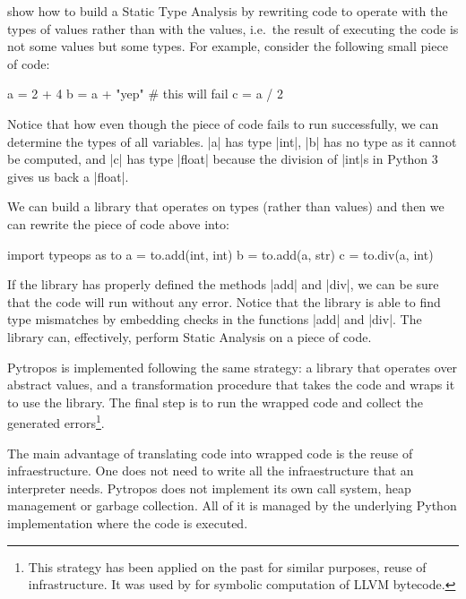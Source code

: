 \textcite{ortin_towards_2015} show how to build a Static Type Analysis
by rewriting code to operate with the types of values rather than with
the values, i.e.~the result of executing the code is not some values but
some types. For example, consider the following small piece of code:

\begin{pythoncode}
a = 2 + 4
b = a + "yep"  # this will fail
c = a / 2
\end{pythoncode}

Notice that how even though the piece of code fails to run successfully,
we can determine the types of all variables. \pycode|a| has type
\pycode|int|, \pycode|b| has no type as it cannot be
computed, and \pycode|c| has type \pycode|float| because the
division of \pycode|int|s in Python 3 gives us back a \pycode|float|.

We can build a library that operates on types (rather than values) and
then we can rewrite the piece of code above into:

\begin{pythoncode}
import typeops as to
a = to.add(int, int)
b = to.add(a, str)
c = to.div(a, int)
\end{pythoncode}

If the library has properly defined the methods \pycode|add| and
\pycode|div|, we can be sure that the code will run without any error.
Notice that the library is able to find type mismatches by embedding
checks in the functions \pycode|add| and \pycode|div|. The library can,
effectively, perform Static Analysis on a piece of code.

Pytropos is implemented following the same strategy: a library that
operates over abstract values, and a transformation procedure that takes
the code and wraps it to use the library. The final step is to run the
wrapped code and collect the generated errors\footnote{This strategy has
  been applied on the past for similar purposes, reuse of
  infrastructure. It was used by \textcite{lauko_symbolic_2018} for
  symbolic computation of LLVM bytecode.
  }.

The main advantage of translating code into wrapped code is the reuse of
infraestructure. One does not need to write all the infraestructure that
an interpreter needs. Pytropos does not implement its own call system,
heap management or garbage collection. All of it is managed by the
underlying Python implementation where the code is executed.

